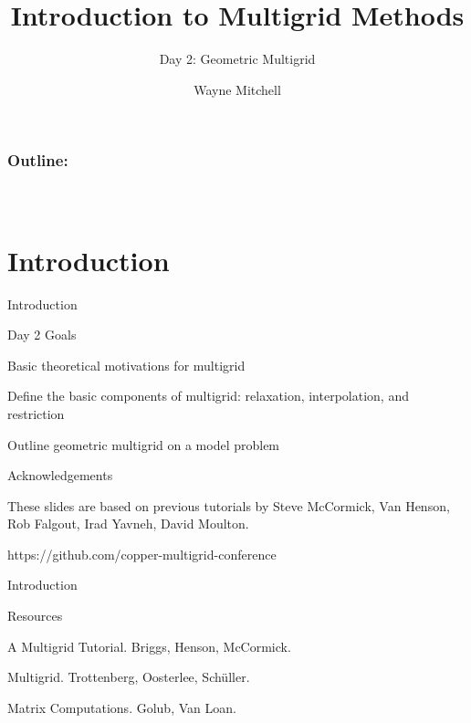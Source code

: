 \documentclass[18pt,xcolor=table]{beamer}
\title[Multigrid]{Introduction to Multigrid Methods}
\subtitle{Day 2: Geometric Multigrid}
\author[Mitchell]{Wayne Mitchell}
\institute{\pgfuseimage{logo}\\Universit\"at Heidelberg\\Institut f\"ur Technische Informatik}
\date[]{\alert{}}
\begin{document}


\DeclareRobustCommand{\Chi}{\raisebox{2pt}{$\chi$}}

\begin{frame}
\frametitle{\bf Outline:}
\framesubtitle{~~}
\tableofcontents
\end{frame}


\section{Introduction}

\begin{frame}{Introduction}
\begin{block}{Day 2 Goals}
\bit
\item Basic theoretical motivations for multigrid
\item Define the basic components of multigrid: relaxation, interpolation, and restriction
\item Outline geometric multigrid on a model problem
\eit
\end{block}
\end{frame}

\begin{frame}
\begin{block}{Acknowledgements}
\bit
\item These slides are based on previous tutorials by Steve McCormick, Van Henson, Rob Falgout, Irad Yavneh, David Moulton.
\item https://github.com/copper-multigrid-conference
\eit
\end{block}
\end{frame}

\begin{frame}{Introduction}
\begin{block}{Resources}
\bit
\item A Multigrid Tutorial. Briggs, Henson, McCormick.
\item Multigrid. Trottenberg, Oosterlee, Sch\"uller.
\item Matrix Computations. Golub, Van Loan.
\eit
\end{block}
\end{frame}

\end{document}
